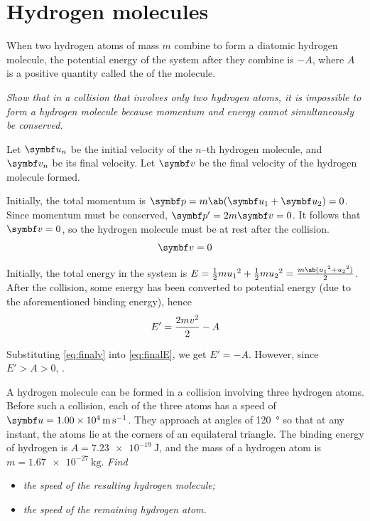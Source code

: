 \section{Hydrogen molecules}
When two hydrogen atoms of mass \(m\) combine to form a diatomic
hydrogen molecule,
the potential energy of the system after they combine is \(-A\),
where \(A\) is a positive quantity called the
 of the molecule.

\it{Show that in a collision that involves only two hydrogen atoms,
  it is impossible to form a
  hydrogen molecule because momentum and energy cannot simultaneously
be conserved.}

Let \(\mv{u}_n\) be the initial velocity of the \(n\)--th hydrogen molecule, and
\(\mv{v}_n\) be its final velocity. Let \(\mv{v}\) be the final velocity of the
hydrogen molecule formed.

Initially, the total momentum is \(\mv{p} = m\ab(\mv{u}_1 + \mv{u}_2)
= 0\). Since momentum
must be conserved, \(\mv{p}' = 2m\mv{v} = 0\). It follows that
\(\mv{v} = 0\), so
the hydrogen molecule must be at rest after the collision.
\begin{equation}
  \mv{v} = 0
  \label{eq:finalv}
\end{equation}

Initially, the total energy in the system is \(E = \f{1}{2}m{u_1}^2 +
\f{1}{2}m{u_2}^2 = \f{m\ab({u_1}^2 + {u_2}^2)}{2}\).
After the collision, some energy has been converted to potential
energy (due to the aforementioned binding energy),
hence
\begin{equation}
  E' = \frac{2mv^2}{2} - A
  \label{eq:finalE}
\end{equation}

Substituting \cref{eq:finalv} into \cref{eq:finalE}, we get \(E' = -A\).
However, since \(E' > A > 0\), .

A hydrogen molecule can be formed in a collision involving three
hydrogen atoms.
Before such a collision, each of the three atoms has a speed of
\(\mv{u}=\qty{1.00e4}{\metre\per\second}\). They approach at angles
of \qty{120}{\degree}
so that at any instant, the atoms lie at the corners of an equilateral triangle.
The binding energy of hydrogen is \(A = \qty{7.23e-19}{\joule}\), and the mass
of a hydrogen atom is \(m = \qty{1.67e-27}{\kg}\). \it{Find}
\begin{itemize}
  \item \it{the speed of the resulting hydrogen molecule;}
  \item \it{the speed of the remaining hydrogen atom.}
\end{itemize}

